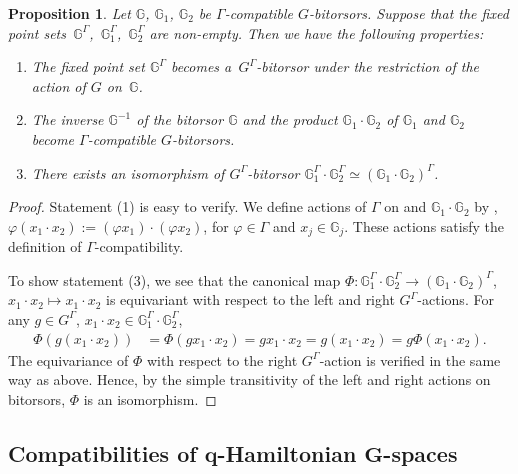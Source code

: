 \documentclass[pdftex]{sigma}
\numberwithin{equation}{section}
\newtheorem{Proposition}[Theorem]{Proposition}
\theoremstyle{definition}
\newcommand{\bG}{\mathbb{G}}
\begin{document}
\begin{Proposition}
Let $\bG$, $\bG_1$, $\bG_2$ be $\Gamma$-compatible $G$-bitorsors. Suppose that the fixed point sets~$\bG^{\Gamma}$,~$\bG_1^{\Gamma}$,~$\bG_2^{\Gamma}$ are non-empty.
Then we have the following properties:
\begin{enumerate}\itemsep=0pt
 \item [$(1)$] The fixed point set $\bG^{\Gamma}$ becomes a~$G^{\Gamma}$-bitorsor under the restriction of the action of $G$ on~$\bG$.
 \item [$(2)$] The inverse $\bG^{-1}$ of the bitorsor $\bG$ and the product $\bG_1 \cdot \bG_2$ of $\bG_1$ and $\bG_2$ become $\Gamma$-compatible $G$-bitorsors.
 \item [$(3)$] There exists an isomorphism of $G^{\Gamma}$-bitorsor $\bG_1^{\Gamma}\cdot \bG_2^{\Gamma} \simeq (\bG_1 \cdot \bG_2)^{\Gamma}$.
\end{enumerate}
\end{Proposition}

\begin{proof}
 Statement (1) is easy to verify.
 We define actions of $\Gamma$ on \smash{$\bG_1^{-1}$} and $\bG_1\cdot \bG_2$ by , $\varphi (x_1 \cdot x_2) := (\varphi x_1) \cdot (\varphi x_2)$,
 for $\varphi \in \Gamma$ and $x_j \in \bG_j$.
 These actions satisfy the definition of $\Gamma$-compatibility.

 To show statement (3), we see that the canonical map $ \Phi \colon \bG_1^{\Gamma} \cdot \bG_2^{\Gamma} \to (\bG_1 \cdot \bG_2)^{\Gamma}$, $ x_1 \cdot x_2 \mapsto x_1 \cdot x_2$
 is equivariant with respect to the left and right $G^{\Gamma}$-actions.
 For any $g \in G^{\Gamma}$, $x_1 \cdot x_2 \in \bG_1^{\Gamma} \cdot \bG_2^{\Gamma}$,
 \begin{align*}
 \Phi(g (x_1 \cdot x_2)) &= \Phi(g x_1 \cdot x_2) = gx_1 \cdot x_2 = g (x_1 \cdot x_2) = g \Phi(x_1 \cdot x_2).
 \end{align*}
 The equivariance of $\Phi$ with respect to the right $G^{\Gamma}$-action is verified in the same way as above.
 Hence, by the simple transitivity of the left and right actions on bitorsors, $\Phi$ is an isomorphism.
\end{proof}

\subsection[Compatibilities of q-Hamiltonian G-spaces]{Compatibilities of $\boldsymbol{q}$-Hamiltonian $\boldsymbol{G}$-spaces}
\end{document}
